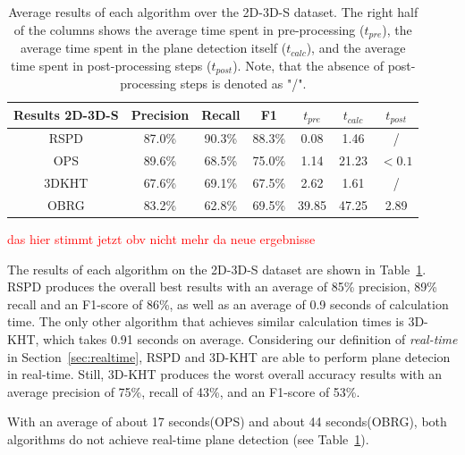 \documentclass[main.tex]{subfiles}
\begin{document}
\begin{table}[H]
    \centering
    \begin{tabular}{c|cccccc}
        Results 2D-3D-S & Precision & Recall & F1     & $t_{pre}$ & $t_{calc}$ & $t_{post}$ \\ \hline
        RSPD            & 87.0\%    & 90.3\% & 88.3\% & 0.08      & 1.46       & /          \\
        OPS             & 89.6\%    & 68.5\% & 75.0\% & 1.14      & 21.23      & $<0.1$     \\
        3DKHT           & 67.6\%    & 69.1\% & 67.5\% & 2.62      & 1.61       & /          \\
        OBRG            & 83.2\%    & 62.8\% & 69.5\% & 39.85     & 47.25      & 2.89
    \end{tabular}
    \caption[Overall 2D-3D-S Results]{Average results of each algorithm over the 2D-3D-S dataset. The right half of the columns shows the average time spent in
        pre-processing ($t_{pre}$), the average time spent in the plane detection itself ($t_{calc}$), and the average time spent in post-processing steps ($t_{post}$).
        Note, that the absence of post-processing steps is denoted as "/".}
    \label{tab:res-3d2ds-total}
\end{table}

\textcolor{red}{das hier stimmt jetzt obv nicht mehr da neue ergebnisse}

The results of each algorithm on the 2D-3D-S dataset are shown in Table~\ref{tab:res-3d2ds-total}.
RSPD produces the overall best results with an average of 85\% precision, 89\% recall and an F1-score of 86\%, as well as an average of 0.9 seconds of calculation time.
The only other algorithm that achieves similar calculation times is 3D-KHT, which takes 0.91 seconds on average. Considering our definition of \textit{real-time} in Section~\ref{sec:realtime},
RSPD and 3D-KHT are able to perform plane detecion in real-time. Still, 3D-KHT produces the worst overall accuracy results with an average precision of 75\%, recall of 43\%, and an F1-score of 53\%.

With an average of about 17 seconds(OPS) and about 44 seconds(OBRG), both algorithms do not achieve real-time plane detection (see Table~\ref{tab:res-3d2ds-total}).
\end{document}
